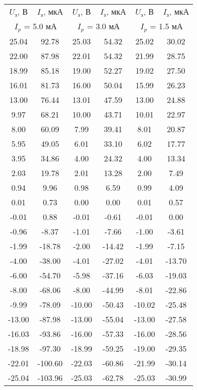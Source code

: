 \begin{tabular}{cc|cc|cc}
\toprule
$U_\text{з}$, В & $I_\text{з}$, мкА & $U_\text{з}$, В & $I_\text{з}$, мкА & $U_\text{з}$, В & $I_\text{з}$, мкА \\
 \multicolumn{2}{c}{$I_p$ = 5.0 мА} & \multicolumn{2}{c}{$I_p$ = 3.0 мА} & \multicolumn{2}{c}{$I_p$ = 1.5 мА} \\
\midrule
 25.04 &   92.78 &  25.03 &  54.32 &  25.02 &  30.02 \\
 22.00 &   87.98 &  22.01 &  54.32 &  21.99 &  28.75 \\
 18.99 &   85.18 &  19.00 &  52.27 &  19.02 &  27.50 \\
 16.01 &   81.73 &  16.00 &  50.04 &  15.99 &  26.23 \\
 13.00 &   76.44 &  13.01 &  47.59 &  13.00 &  24.88 \\
  9.97 &   68.21 &  10.00 &  43.71 &  10.01 &  22.97 \\
  8.00 &   60.09 &   7.99 &  39.41 &   8.01 &  20.87 \\
  5.95 &   49.05 &   6.01 &  33.10 &   6.02 &  17.77 \\
  3.95 &   34.86 &   4.00 &  24.32 &   4.00 &  13.34 \\
  2.03 &   19.78 &   2.01 &  13.28 &   2.00 &   7.49 \\
  0.94 &    9.96 &   0.98 &   6.59 &   0.99 &   4.09 \\
  0.01 &    0.73 &   0.00 &   0.00 &   0.01 &   0.57 \\
 -0.01 &    0.88 &  -0.01 &  -0.61 &  -0.01 &   0.00 \\
 -0.96 &   -8.37 &  -1.01 &  -7.66 &  -1.00 &  -3.61 \\
 -1.99 &  -18.78 &  -2.00 & -14.42 &  -1.99 &  -7.15 \\
 -4.00 &  -38.00 &  -4.01 & -27.02 &  -4.01 & -13.70 \\
 -6.00 &  -54.70 &  -5.98 & -37.16 &  -6.03 & -19.03 \\
 -8.00 &  -68.06 &  -8.00 & -44.99 &  -8.01 & -22.86 \\
 -9.99 &  -78.09 & -10.00 & -50.43 & -10.02 & -25.48 \\
-13.00 &  -87.98 & -13.00 & -55.04 & -13.00 & -27.58 \\
-16.03 &  -93.86 & -16.00 & -57.33 & -16.00 & -28.56 \\
-18.98 &  -97.30 & -18.99 & -59.25 & -19.00 & -29.35 \\
-22.01 & -100.60 & -22.03 & -60.86 & -21.99 & -30.14 \\
-25.04 & -103.96 & -25.03 & -62.78 & -25.03 & -30.99 \\
\bottomrule
\end{tabular}
